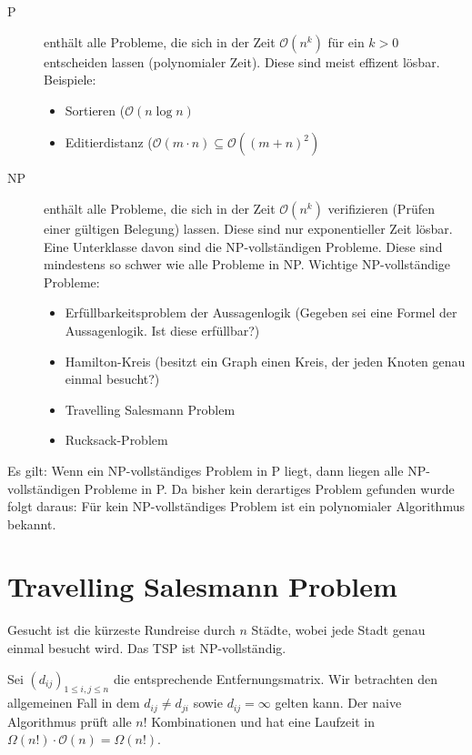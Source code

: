 \begin{description}
	\item[P] enthält alle Probleme, die sich in der Zeit \(\mathcal{O}(n^{k})\) für ein \(k>0\) entscheiden lassen (polynomialer Zeit).
		Diese sind meist effizent lösbar.
		Beispiele:
			\begin{itemize}
				\item Sortieren (\(\mathcal{O}(n \log n)\)
				\item Editierdistanz (\(\mathcal{O}(m \cdot n) \subseteq \mathcal{O}((m+n)^{2})\)
			\end{itemize}
	\item[NP] enthält alle Probleme, die sich in der Zeit \(\mathcal{O}(n^{k})\) verifizieren (Prüfen einer gültigen Belegung) lassen.
		Diese sind nur exponentieller Zeit lösbar.
		Eine Unterklasse davon sind die NP-vollständigen Probleme.
		Diese sind mindestens so schwer wie alle Probleme in NP.
		Wichtige NP-vollständige Probleme:
		\begin{itemize}
			\item Erfüllbarkeitsproblem der Aussagenlogik (Gegeben sei eine Formel der Aussagenlogik. Ist diese erfüllbar?)
			\item Hamilton-Kreis (besitzt ein Graph einen Kreis, der jeden Knoten genau einmal besucht?)
			\item Travelling Salesmann Problem
			\item Rucksack-Problem
		\end{itemize}
\end{description}
Es gilt: Wenn ein NP-vollständiges Problem in P liegt, dann liegen alle NP-vollständigen Probleme in P.
Da bisher kein derartiges Problem gefunden wurde folgt daraus: Für kein NP-vollständiges Problem ist ein polynomialer Algorithmus bekannt.


\section{Travelling Salesmann Problem}
\label{sec:TSP}
Gesucht ist die kürzeste Rundreise durch \(n\) Städte, wobei jede Stadt genau einmal besucht wird.
Das TSP ist NP-vollständig.

Sei \((d_{ij})_{1 \leq i, j \leq n}\) die entsprechende Entfernungsmatrix.
Wir betrachten den allgemeinen Fall in dem \(d_{ij} \neq d_{ji}\) sowie \(d_{ij} = \infty\) gelten kann.
Der naive Algorithmus prüft alle \(n!\) Kombinationen und hat eine Laufzeit in \(\Omega(n!) \cdot \mathcal{O}(n) = \Omega(n!)\).

